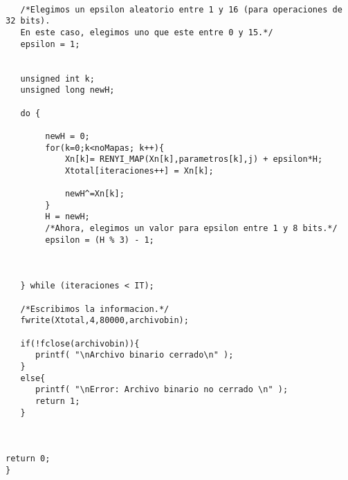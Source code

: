 \documentclass[12pt,3p]{elsarticle}
\begin{document}
\begin{verbatim}
 
   /*Elegimos un epsilon aleatorio entre 1 y 16 (para operaciones de 32 bits).
   En este caso, elegimos uno que este entre 0 y 15.*/
   epsilon = 1;   
  
      
   unsigned int k;
   unsigned long newH;

   do {
        
        newH = 0;
        for(k=0;k<noMapas; k++){            
            Xn[k]= RENYI_MAP(Xn[k],parametros[k],j) + epsilon*H;
            Xtotal[iteraciones++] = Xn[k];
              
            newH^=Xn[k];      
        }
        H = newH;
        /*Ahora, elegimos un valor para epsilon entre 1 y 8 bits.*/
        epsilon = (H % 3) - 1;
     
 

   } while (iteraciones < IT);
   
   /*Escribimos la informacion.*/
   fwrite(Xtotal,4,80000,archivobin); 

   if(!fclose(archivobin)){
      printf( "\nArchivo binario cerrado\n" );
   }
   else{
      printf( "\nError: Archivo binario no cerrado \n" );
      return 1;
   }
   
   

return 0;
}
\end{verbatim}
\end{document}
